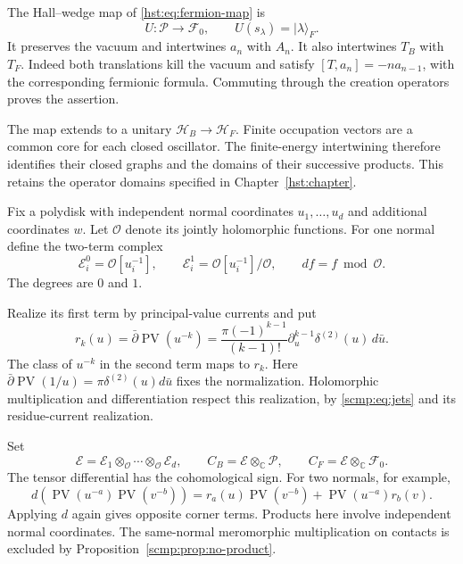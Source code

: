 The Hall--wedge map of \eqref{hst:eq:fermion-map} is
\begin{equation}\label{hfill:eq:U}
 U:\mathcal P\longrightarrow\mathcal F_0,
 \qquad U(s_\lambda)=|\lambda\rangle_F.
\end{equation}
It preserves the vacuum and intertwines $a_n$ with $A_n$.
It also intertwines $T_B$ with $T_F$.
Indeed both translations kill the vacuum and satisfy
$[T,a_n]=-n a_{n-1}$, with the corresponding fermionic formula.
Commuting through the creation operators proves the assertion.

The map extends to a unitary $\mathcal H_B\to\mathcal H_F$.
Finite occupation vectors are a common core for each closed oscillator.
The finite-energy intertwining therefore identifies their closed graphs
and the domains of their successive products.
This retains the operator domains specified in Chapter~\ref{hst:chapter}.

Fix a polydisk with independent normal coordinates
$u_1,\ldots,u_d$ and additional coordinates $w$.
Let $\mathcal O$ denote its jointly holomorphic functions.
For one normal define the two-term complex
\begin{equation}\label{hfill:eq:contact-complex}
 \mathcal E_i^0=\mathcal O[u_i^{-1}],\qquad
 \mathcal E_i^1=\mathcal O[u_i^{-1}]/\mathcal O,
 \qquad d f=f\bmod\mathcal O.
\end{equation}
The degrees are $0$ and $1$.

Realize its first term by principal-value currents and put
\begin{equation}\label{hfill:eq:residue}
 r_k(u)=\bar\partial\operatorname{PV}(u^{-k})
 =\frac{\pi(-1)^{k-1}}{(k-1)!}
       \partial_u^{k-1}\delta^{(2)}(u)\,d\bar u.
\end{equation}
The class of $u^{-k}$ in the second term maps to $r_k$.
Here $\bar\partial\operatorname{PV}(1/u)
=\pi\delta^{(2)}(u)d\bar u$ fixes the normalization.
Holomorphic multiplication and differentiation respect this realization,
by \eqref{scmp:eq:jets} and its residue-current realization.

Set
\[
 \mathcal E=\mathcal E_1\otimes_{\mathcal O}\cdots
                         \otimes_{\mathcal O}\mathcal E_d,
 \qquad
 C_B=\mathcal E\otimes_{\mathbb C}\mathcal P,
 \qquad C_F=\mathcal E\otimes_{\mathbb C}\mathcal F_0.
\]
The tensor differential has the cohomological sign.
For two normals, for example,
\[
 d(\operatorname{PV}(u^{-a})\operatorname{PV}(v^{-b}))
 =r_a(u)\operatorname{PV}(v^{-b})
   +\operatorname{PV}(u^{-a})r_b(v).
\]
Applying $d$ again gives opposite corner terms.
Products here involve independent normal coordinates.
The same-normal meromorphic multiplication on contacts is excluded by
Proposition~\ref{scmp:prop:no-product}.

